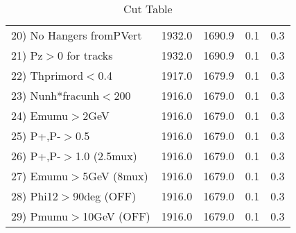 \begin{table}[h!]
\begin{tabular}{||l||r|r|r|r||}
 20) No Hangers fromPVert &      1932.0 &      1690.9 &         0.1 &         0.3 \\
 21) Pz$>$0 for tracks    &      1932.0 &      1690.9 &         0.1 &         0.3 \\
 22) Thprimord$<$0.4      &      1917.0 &      1679.9 &         0.1 &         0.3 \\
 23) Nunh*fracunh$<$200   &      1916.0 &      1679.0 &         0.1 &         0.3 \\
 24) Emumu$>$2GeV         &      1916.0 &      1679.0 &         0.1 &         0.3 \\
 25) P+,P-$>$0.5          &      1916.0 &      1679.0 &         0.1 &         0.3 \\
 26) P+,P-$>$1.0 (2.5mux) &      1916.0 &      1679.0 &         0.1 &         0.3 \\
 27) Emumu$>$5GeV  (8mux) &      1916.0 &      1679.0 &         0.1 &         0.3 \\
 28) Phi12$>$90deg  (OFF) &      1916.0 &      1679.0 &         0.1 &         0.3 \\
 29) Pmumu$>$10GeV  (OFF) &      1916.0 &      1679.0 &         0.1 &         0.3 \\
 \hline
 \hline
 \end{tabular}
 \caption{Cut Table \cohjp  }
 \label{tab-cut__jpsi}
 \end{table}
